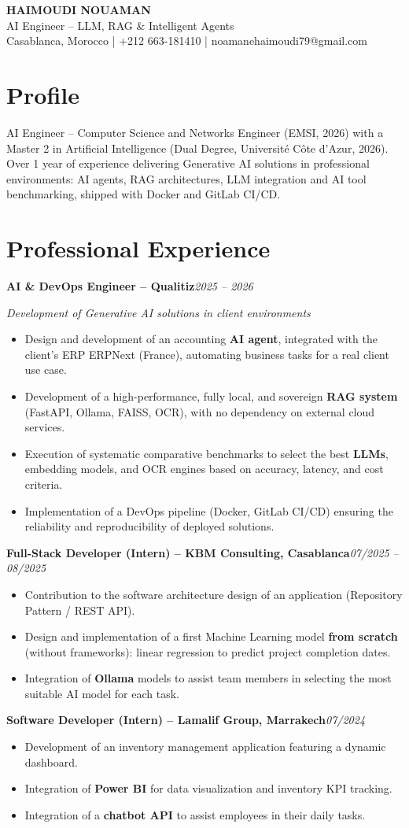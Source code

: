 \documentclass[10pt,a4paper]{article}
\newcommand{\entryheader}[2]{%
  \par\noindent\textbf{#1}\hfill\textit{#2}\par
}
\begin{document}
{\Large\bfseries\color{headcolor} HAIMOUDI NOUAMAN}\\[3pt]
{\normalsize\color{lightgray} AI Engineer -- LLM, RAG \& Intelligent Agents}\\[4pt]
Casablanca, Morocco \quad | \quad +212 663-181410 \quad | \quad noamanehaimoudi79@gmail.com
\section{Profile}
AI Engineer -- Computer Science and Networks Engineer (EMSI, 2026) with a Master 2 in Artificial Intelligence (Dual Degree, Université Côte d'Azur, 2026). Over 1 year of experience delivering Generative AI solutions in professional environments: AI agents, RAG architectures, LLM integration and AI tool benchmarking, shipped with Docker and GitLab CI/CD.
\section{Professional Experience}
\entryheader{AI \& DevOps Engineer -- Qualitiz}{2025 -- 2026}
\textit{Development of Generative AI solutions in client environments}
\begin{itemize}
  \item Design and development of an accounting \textbf{AI agent}, integrated with the client's ERP ERPNext (France), automating business tasks for a real client use case.
  \item Development of a high-performance, fully local, and sovereign \textbf{RAG system} (FastAPI, Ollama, FAISS, OCR), with no dependency on external cloud services.
  \item Execution of systematic comparative benchmarks to select the best \textbf{LLMs}, embedding models, and OCR engines based on accuracy, latency, and cost criteria.
  \item Implementation of a DevOps pipeline (Docker, GitLab CI/CD) ensuring the reliability and reproducibility of deployed solutions.
\end{itemize}
\entryheader{Full-Stack Developer (Intern) -- KBM Consulting, Casablanca}{07/2025 -- 08/2025}
\begin{itemize}
  \item Contribution to the software architecture design of an application (Repository Pattern / REST API).
  \item Design and implementation of a first Machine Learning model \textbf{from scratch} (without frameworks): linear regression to predict project completion dates.
  \item Integration of \textbf{Ollama} models to assist team members in selecting the most suitable AI model for each task.
\end{itemize}
\entryheader{Software Developer (Intern) -- Lamalif Group, Marrakech}{07/2024}
\begin{itemize}
  \item Development of an inventory management application featuring a dynamic dashboard.
  \item Integration of \textbf{Power BI} for data visualization and inventory KPI tracking.
  \item Integration of a \textbf{chatbot API} to assist employees in their daily tasks.
\end{itemize}
\end{document}
